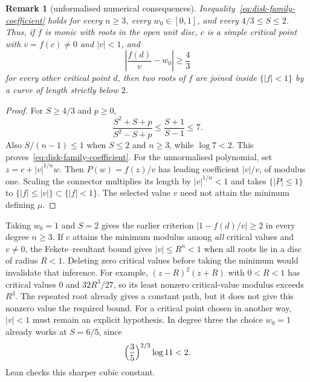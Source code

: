 \documentclass[11pt]{article}
\newtheorem{remark}[theorem]{Remark}
\begin{document}
\begin{remark}[unformalised numerical consequences]
\label{res:critical-value-thresholds}
Inequality~\eqref{eq:disk-family-coefficient} holds for every $n\ge3$,
every $w_0\in[0,1]$, and every $4/3\le S\le2$.  Thus, if $f$ is monic with
roots in the open unit disc, $c$ is a simple critical point with
$v=f(c)\ne0$ and $|v|<1$, and
\[
 \left|\frac{f(d)}v-w_0\right|\ge\frac43
\]
for every other critical point $d$, then two roots of $f$ are joined inside
$\{|f|<1\}$ by a curve of length strictly below $2$.
\end{remark}


\begin{proof}
For $S\ge4/3$ and $p\ge0$,
\[
 \frac{S^2+S+p}{S^2-S+p}\le\frac{S+1}{S-1}\le7.
\]
Also $S/(n-1)\le1$ when $S\le2$ and $n\ge3$, while $\log7<2$.
This proves~\eqref{eq:disk-family-coefficient}.  For the unnormalised
polynomial, set $z=c+|v|^{1/n}w$. Then $P(w)=f(z)/v$ has leading
coefficient $|v|/v$, of modulus one. Scaling the connector multiplies its
length by $|v|^{1/n}<1$ and takes $\{|P|\le1\}$ to
$\{|f|\le|v|\}\subset\{|f|<1\}$. The selected value $v$ need not attain
the minimum defining $\mu$.
\end{proof}

Taking $w_0=1$ and $S=2$ gives the earlier criterion
$|1-f(d)/v|\ge2$ in every degree $n\ge3$. If $c$ attains the minimum
modulus among \emph{all} critical values and $v\ne0$, the
Fekete--resultant bound gives $|v|\le R^n<1$ when all roots lie in a disc
of radius $R<1$. Deleting zero critical values before taking the minimum
would invalidate that inference. For example, $(z-R)^2(z+R)$ with $0<R<1$ has critical
values $0$ and $32R^3/27$, so its least nonzero critical-value modulus
exceeds $R^3$. The repeated root already gives a constant path, but it
does not give this nonzero value the required bound. For a critical point
chosen in another way, $|v|<1$ must remain an explicit hypothesis.
In degree three the choice $w_0=1$ already works at
$S=6/5$, since
\[
 \Bigl(\frac35\Bigr)^{2/3}\log 11<2.
\]
Lean checks this sharper cubic constant.
\end{document}
